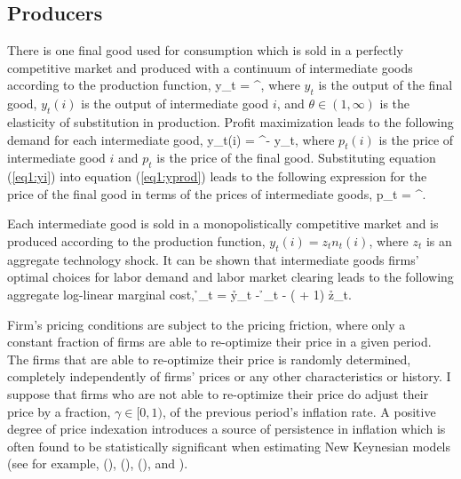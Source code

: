 \subsection{Producers}
There is one final good used for consumption which is sold in a perfectly competitive market and produced with a continuum of intermediate goods according to the production function,
\beq \label{eq1:yprod} y_t = ^{}, \eeq
where $y_t$ is the output of the final good, $y_t(i)$ is the output of intermediate good $i$, and $\theta\in(1,\infty)$ is the elasticity of substitution in production.  Profit maximization leads to the following demand for each intermediate good,
\beq \label{eq1:yi} y_t(i) = ^{-\theta} y_t, \eeq
where $p_t(i)$ is the price of intermediate good $i$ and $p_t$ is the price of the final good.  Substituting equation (\ref{eq1:yi}) into equation (\ref{eq1:yprod}) leads to the following expression for the price of the final good in terms of the prices of intermediate goods,
\beq \label{eq1:pfinal} p_t = ^{}. \eeq

Each intermediate good is sold in a monopolistically competitive market and is produced according to the production function, $y_t(i) = z_t n_t(i)$, where $z_t$ is an aggregate technology shock.  It can be shown that intermediate goods firms' optimal choices for labor demand and labor market clearing leads to the following aggregate log-linear marginal cost,
\beq \label{eq1:mc2} \h{\psi}_t =  \h{y}_t - \h{\lambda}_t - \left( + 1\right) \h{z}_t. \eeq

Firm's pricing conditions are subject to the  pricing friction, where only a constant fraction of firms are able to re-optimize their price in a given period.  The firms that are able to re-optimize their price is randomly determined, completely independently of firms' prices or any other characteristics or history.  I suppose that firms who are not able to re-optimize their price do adjust their price by a fraction, $\gamma \in [0,1)$, of the previous period's inflation rate.  A positive degree of price indexation introduces a source of persistence in inflation which is often found to be statistically significant when estimating New Keynesian models (see for example,  (\citeyear{smetswouters2003}), (\citeyear{smetswouters2003}), (\citeyear{smetswouters2007}), and ).


